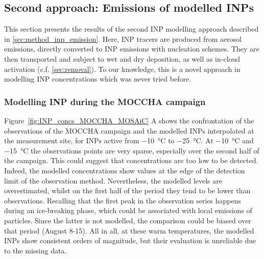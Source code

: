    \subsection{Second approach: Emissions of modelled INPs}
    \label{sec:second_approach}
    This section presents the results of the second INP modelling approach described in \cref{sec:method_inp_emission}.
    Here, INP tracers are produced from aerosol emissions, directly converted to INP emissions with nucleation schemes. They are then transported and subject to wet and dry deposition, as well as in-cloud activation (c.f. \cref{sec:removal}). To our knowledge, this is a novel approach in modelling INP concentrations which was never tried before.
    
        \subsubsection{Modelling INP during the MOCCHA campaign}
        \label{sec:INP_modelling_MOCCHA}
        Figure~\ref{fig:INP_concs_MOCCHA_MOSAiC} A shows the confrontation of the observations of the MOCCHA campaign and the modelled INPs interpolated at the measurement site, for INPs active from \SI{-10}{\degreeCelsius} to \SI{-25}{\degreeCelsius}.
        At \SI{-10}{\degreeCelsius} and \SI{-15}{\degreeCelsius} the observations points are very sparse, especially over the second half of the campaign. This could suggest that concentrations are too low to be detected. Indeed, the modelled concentrations show values at the edge of the detection limit of the observation method. Nevertheless, the modelled levels are overestimated, whilst on the first half of the period they tend to be lower than observations.
        Recalling that the first peak in the observation series happens during an ice-breaking phase, which could be associated with local emissions of particles. Since the latter is not modelled, the comparison could be biased over that period (August 8-15).
        All in all, at these warm temperatures, the modelled INPs show consistent orders of magnitude, but their evaluation is unreliable due to the missing data.
        
